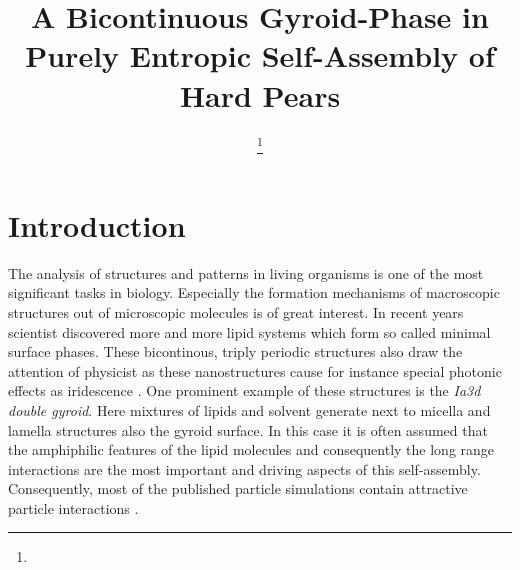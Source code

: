\documentclass[epj,twocolumn]{webofc}
\begin{document}
%
\title{A Bicontinuous Gyroid-Phase in Purely Entropic Self-Assembly of Hard Pears}

\author{ \fnsep\thanks{} \and
         \and 
         \and
         \and
         
}


\abstract{%
}
%
\maketitle
%


\section{Introduction}
\label{sec:Intro}

The analysis of structures and patterns in living organisms is one of the most significant tasks in biology. Especially the formation mechanisms of macroscopic structures out of microscopic molecules is of great interest. In recent 
years scientist discovered more and more lipid systems which form so called minimal surface phases. These bicontinous, triply periodic structures also draw the attention of physicist as these nanostructures cause for instance
special photonic effects as iridescence \cite{}. One prominent example of these structures is the \textit{Ia3d double gyroid}. Here mixtures of lipids and solvent generate next to micella and lamella structures also the gyroid surface.
In this case it is often assumed that the amphiphilic features of the lipid molecules and consequently the long range interactions are the most important and driving aspects of this self-assembly. Consequently, most of the published 
particle simulations contain attractive particle interactions \cite{}.\\
\end{document}
